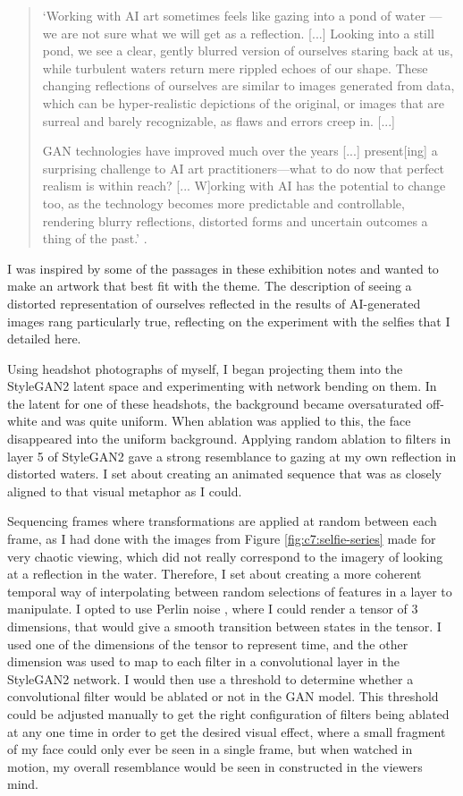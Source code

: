 \begin{quote}
`Working with AI art sometimes feels like gazing into a pond of water — we are not sure what we will get as a reflection. [...] Looking into a still pond, we see a clear, gently blurred version of ourselves staring back at us, while turbulent waters return mere rippled echoes of our shape. These changing reflections of ourselves are similar to images generated from data, which can be hyper-realistic depictions of the original, or images that are surreal and barely recognizable, as flaws and errors creep in. [...]

GAN technologies have improved much over the years [...] present[ing] a surprising challenge to AI art practitioners—what to do now that perfect realism is within reach? [... W]orking with AI has the potential to change too, as the technology becomes more predictable and controllable, rendering blurry reflections, distorted forms and uncertain outcomes a thing of the past.' \citep{elliot2021reflections}.
\end{quote}

I was inspired by some of the passages in these exhibition notes and wanted to make an artwork that best fit with the theme. 
The description of seeing a distorted representation of ourselves reflected in the results of AI-generated images rang particularly true, reflecting on the experiment with the selfies that I detailed here.

Using headshot photographs of myself, I began projecting them into the StyleGAN2 latent space and experimenting with network bending on them. 
In the latent for one of these headshots, the background became oversaturated off-white and was quite uniform. 
When ablation was applied to this, the face disappeared into the uniform background. 
Applying random ablation to filters in layer 5 of StyleGAN2 gave a strong resemblance to gazing at my own reflection in distorted waters.
I set about creating an animated sequence that was as closely aligned to that visual metaphor as I could.

Sequencing frames where transformations are applied at random between each frame, as I had done with the images from Figure \ref{fig:c7:selfie-series} made for very chaotic viewing, which did not really correspond to the imagery of looking at a reflection in the water.
Therefore, I set about creating a more coherent temporal way of interpolating between random selections of features in a layer to manipulate. 
I opted to use Perlin noise \citep{perlin1985image}, where I could render a tensor of 3 dimensions, that would give a smooth transition between states in the tensor.
I used one of the dimensions of the tensor to represent time, and the other dimension was used to map to each filter in a convolutional layer in the StyleGAN2 network.
I would then use a threshold to determine whether a convolutional filter would be ablated or not in the GAN model.
This threshold could be adjusted manually to get the right configuration of filters being ablated at any one time in order to get the desired visual effect, where a small fragment of my face could only ever be seen in a single frame, but when watched in motion, my overall resemblance would be seen in constructed in the viewers mind. 


